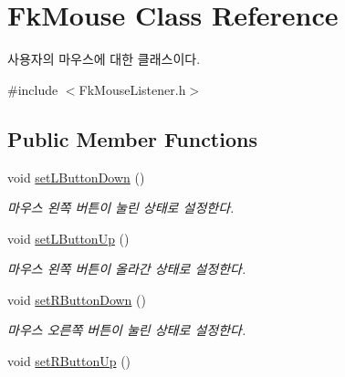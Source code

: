 \hypertarget{class_fk_mouse}{}\section{Fk\+Mouse Class Reference}
\label{class_fk_mouse}


사용자의 마우스에 대한 클래스이다.  




{\ttfamily \#include $<$Fk\+Mouse\+Listener.\+h$>$}

\subsection*{Public Member Functions}
\begin{DoxyCompactItemize}
\item 
\hypertarget{class_fk_mouse_a6742aa327fa89275ff6fc15ce73ac253}{}void \hyperlink{class_fk_mouse_a6742aa327fa89275ff6fc15ce73ac253}{set\+L\+Button\+Down} ()\label{class_fk_mouse_a6742aa327fa89275ff6fc15ce73ac253}

\begin{DoxyCompactList}\small\item\em 마우스 왼쪽 버튼이 눌린 상태로 설정한다. \end{DoxyCompactList}\item 
\hypertarget{class_fk_mouse_a8bb32a058425c72453375891b05bda37}{}void \hyperlink{class_fk_mouse_a8bb32a058425c72453375891b05bda37}{set\+L\+Button\+Up} ()\label{class_fk_mouse_a8bb32a058425c72453375891b05bda37}

\begin{DoxyCompactList}\small\item\em 마우스 왼쪽 버튼이 올라간 상태로 설정한다. \end{DoxyCompactList}\item 
\hypertarget{class_fk_mouse_ab5206633b765a34cace0d09e47a05ef4}{}void \hyperlink{class_fk_mouse_ab5206633b765a34cace0d09e47a05ef4}{set\+R\+Button\+Down} ()\label{class_fk_mouse_ab5206633b765a34cace0d09e47a05ef4}

\begin{DoxyCompactList}\small\item\em 마우스 오른쪽 버튼이 눌린 상태로 설정한다. \end{DoxyCompactList}\item 
\hypertarget{class_fk_mouse_a1ae55c25103bc31d85e8015564d640e8}{}void \hyperlink{class_fk_mouse_a1ae55c25103bc31d85e8015564d640e8}{set\+R\+Button\+Up} ()\label{class_fk_mouse_a1ae55c25103bc31d85e8015564d640e8}


\end{DoxyCompactItemize}
